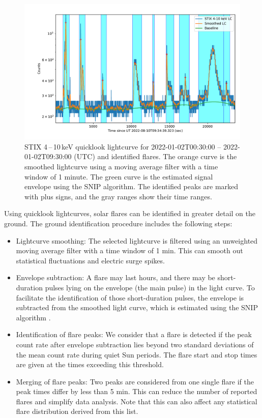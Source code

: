 \documentclass[referee]{aa} %
\begin{document}
\begin{figure}
  \centering
  \includegraphics[width=0.8\linewidth]{figures/flaredet.pdf} %
  \caption{STIX 4\,--\,10\,keV quicklook lightcurve for 2022-01-02T00:30:00 -- 2022-01-02T09:30:00 (UTC) and  identified flares. The orange curve is the smoothed lightcurve using a moving average filter with a time window of 1 minute. The green curve is the estimated signal envelope using the SNIP algorithm.  The identified peaks are marked with plus signs, and the gray ranges show their time ranges.
  }
  \label{fig:flare-det}
\end{figure}
Using quicklook lightcurves, solar flares can be identified in greater detail on the ground. 
The ground identification procedure includes the following steps:
\begin{itemize}
  \item Lightcurve smoothing: The selected lightcurve is filtered using an unweighted moving average filter with a time window of 1 min. This can smooth out statistical fluctuations and electric surge spikes.
  \item Envelope subtraction: A flare may last hours, and there may be short-duration pulses lying on the envelope (the main pulse) in the light curve.  To facilitate the identification of those short-duration pulses, the envelope is subtracted from the smoothed light curve, which is estimated using the SNIP algorithm \citep{snip}. 
  \item Identification of flare peaks: We consider that a flare is detected if the peak count rate after envelope subtraction lies beyond two standard deviations of the mean count rate during quiet Sun periods. The flare start and stop times are given at the times exceeding this threshold.  
  \item Merging of flare peaks: Two peaks are considered from one single flare if the peak times differ by less than 5 min. This can reduce the number of reported flares and simplify data analysis. Note that this can also affect any statistical flare distribution derived from this list.
\end{itemize}
\end{document}
